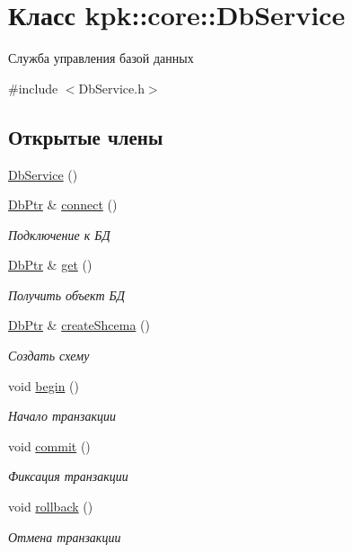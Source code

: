\hypertarget{classkpk_1_1core_1_1_db_service}{}\section{Класс kpk\+:\+:core\+:\+:Db\+Service}
\label{classkpk_1_1core_1_1_db_service}


Служба управления базой данных  




{\ttfamily \#include $<$Db\+Service.\+h$>$}

\subsection*{Открытые члены}
\begin{DoxyCompactItemize}
\item 
\hyperlink{classkpk_1_1core_1_1_db_service_ad7213ea1a3e710889dcd06876c165d95}{Db\+Service} ()
\item 
\hyperlink{namespacekpk_1_1core_a466e66f45327171cc2976df1304573ab}{Db\+Ptr} \& \hyperlink{classkpk_1_1core_1_1_db_service_a185ef44041963592970695ecac61f3c3}{connect} ()
\begin{DoxyCompactList}\small\item\em Подключение к БД \end{DoxyCompactList}\item 
\hyperlink{namespacekpk_1_1core_a466e66f45327171cc2976df1304573ab}{Db\+Ptr} \& \hyperlink{classkpk_1_1core_1_1_db_service_a67de388a45320984577d9223918c13fb}{get} ()
\begin{DoxyCompactList}\small\item\em Получить объект БД \end{DoxyCompactList}\item 
\hyperlink{namespacekpk_1_1core_a466e66f45327171cc2976df1304573ab}{Db\+Ptr} \& \hyperlink{classkpk_1_1core_1_1_db_service_aacb6bafd43eda109a2888bb0d6f86892}{create\+Shcema} ()
\begin{DoxyCompactList}\small\item\em Создать схему \end{DoxyCompactList}\item 
void \hyperlink{classkpk_1_1core_1_1_db_service_a2fcdfaec8a98b2a6224bfbf7e6e0a3b9}{begin} ()
\begin{DoxyCompactList}\small\item\em Начало транзакции \end{DoxyCompactList}\item 
void \hyperlink{classkpk_1_1core_1_1_db_service_a819d4e51894ea9950d69d7d159003aa5}{commit} ()
\begin{DoxyCompactList}\small\item\em Фиксация транзакции \end{DoxyCompactList}\item 
void \hyperlink{classkpk_1_1core_1_1_db_service_a360724207bed795a2ca720961d2808a9}{rollback} ()
\begin{DoxyCompactList}\small\item\em Отмена транзакции \end{DoxyCompactList}\end{DoxyCompactItemize}


